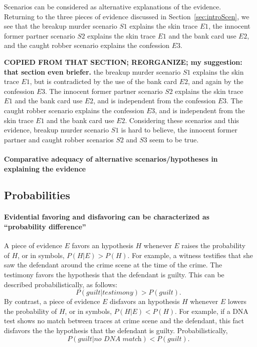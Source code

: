 \documentclass[10pt]{article}
\begin{document}
Scenarios can be considered as alternative explanations of the evidence. Returning to the three pieces of evidence discussed in Section~\ref{sec:introScen}, we see that the breakup murder scenario $S1$ explains the skin trace $E1$, the innocent former partner scenario $S2$ explains the skin trace $E1$ and the bank card use $E2$, and the caught robber scenario explains the confession $E3$.



\textbf{COPIED FROM THAT SECTION; REORGANIZE; my suggestion: that section even briefer.} the breakup murder scenario $S1$ explains the skin trace $E1$, but is contradicted by the use of the bank card $E2$, and again by the confession $E3$. The innocent former partner scenario $S2$ explains the skin trace $E1$ and the bank card use $E2$, and is independent from the confession $E3$. The caught robber scenario explains the confession $E3$, and is independent from the skin trace $E1$ and the bank card use $E2$. Considering these scenarios and this evidence, breakup murder scenario $S1$ is hard to believe, the innocent former partner and caught robber scenarios $S2$ and $S3$ seem to be true.

\paragraph{Comparative adequacy of alternative scenarios/hypotheses in explaining the evidence}





\subsection{Probabilities}

\paragraph{Evidential favoring and disfavoring can be characterized as ``probability difference''} A piece of evidence $E$ favors an 
hypothesis $H$ whenever $E$ raises the probability of $H$, or in symbols, 
$P(H|E) > P(H)$. 
%
%
%
%
For example, a witness 
testifies that she saw the defendant around the crime scene
 at the time of the crime. The testimony favors the hypothesis 
 that the defendant is guilty. 
This can be described probabilistically, as follows:
 \[ P(\textit{guilt}|\textit{testimony}) > P(\textit{guilt}).\] 
By contrast, a piece of evidence $E$ disfavors an hypothesis $H$ whenever $E$ lowers 
the probability of $H$, or in symbols, $P(H|E) < P(H)$.
For example, if a DNA test shows no match between traces at crime
 scene and the defendant, this fact  disfavors the the hypothesis that the defendant is guilty. 
 Probabilistically, 
%
\[ P(\textit{guilt}|\textit{no DNA match}) < P(\textit{guilt}).\]  
%
 
\end{document}
